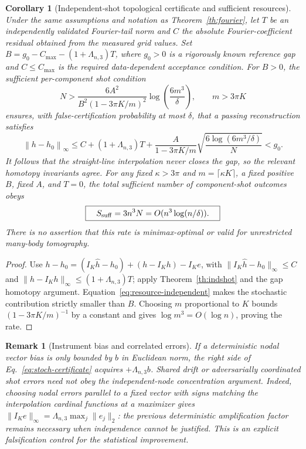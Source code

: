 \documentclass[aps,prd,onecolumn,notitlepage,11pt,superscriptaddress,longbibliography]{revtex4-2}
\newtheorem{corollary}{Corollary}
\newtheorem{remark}{Remark}
\newcommand{\norm}[1]{\left\lVert#1\right\rVert}
\begin{document}
\begin{corollary}[Independent-shot topological certificate and sufficient resources]\label{co:indshot}
Under the same assumptions and notation as Theorem~\ref{th:fourier}, let $T$ be an independently validated Fourier-tail norm and $C$ the absolute Fourier-coefficient residual obtained from the measured grid values. Set $B=g_0-C_{\max}-(1+\Lambda_{n,3})T$, where $g_0>0$ is a rigorously known reference gap and $C\le C_{\max}$ is the required data-dependent acceptance condition. For $B>0$, the sufficient per-component shot condition
\begin{equation}\label{eq:resource-independent}
\boxed{\quad N>
\frac{6A^2}{B^2(1-3\pi K/m)^2}
\log\left(\frac{6m^3}{\delta}\right),\qquad m>3\pi K\quad}
\end{equation}
ensures, with false-certification probability at most $\delta$, that a \emph{passing} reconstruction satisfies
\begin{equation}\label{eq:stoch-certificate}
\boxed{\quad
\norm{h-h_0}_\infty\le C+(1+\Lambda_{n,3})T+
\frac{A}{1-3\pi K/m}\sqrt{\frac{6\log(6m^3/\delta)}{N}}<g_0.\quad}
\end{equation}
It follows that the straight-line interpolation never closes the gap, so the relevant homotopy invariants agree. For any fixed $\kappa>3\pi$ and $m=\lceil\kappa K\rceil$, a fixed positive $B$, fixed $A$, and $T=0$, the total \emph{sufficient} number of component-shot outcomes obeys
\begin{equation}\label{eq:stochastic-rate}
\boxed{\quad S_{\rm suff}=3n^3N=O(n^3\log(n/\delta)).\quad}
\end{equation}
There is no assertion that this rate is minimax-optimal or valid for unrestricted many-body tomography.
\end{corollary}
\begin{proof}
Use $h-h_0=(I_K\widehat h-h_0)+(h-I_Kh)-I_K e$, with $\|I_K\widehat h-h_0\|_\infty\le C$ and $\|h-I_Kh\|_\infty\le(1+\Lambda_{n,3})T$; apply Theorem~\ref{th:indshot} and the gap homotopy argument. Equation~\eqref{eq:resource-independent} makes the stochastic contribution strictly smaller than $B$. Choosing $m$ proportional to $K$ bounds $(1-3\pi K/m)^{-1}$ by a constant and gives $\log m^3=O(\log n)$, proving the rate.
\end{proof}

\begin{remark}[Instrument bias and correlated errors]
If a deterministic nodal vector bias is only bounded by $b$ in Euclidean norm, the right side of Eq.~\eqref{eq:stoch-certificate} acquires $+\Lambda_{n,3}b$. Shared drift or adversarially coordinated shot errors need not obey the independent-node concentration argument. Indeed, choosing nodal errors parallel to a fixed vector with signs matching the interpolation cardinal functions at a maximizer gives $\|I_K e\|_\infty=\Lambda_{n,3}\max_j\|e_j\|_2$: the previous deterministic amplification factor remains necessary when independence cannot be justified. This is an explicit falsification control for the statistical improvement.
\end{remark}
\end{document}
